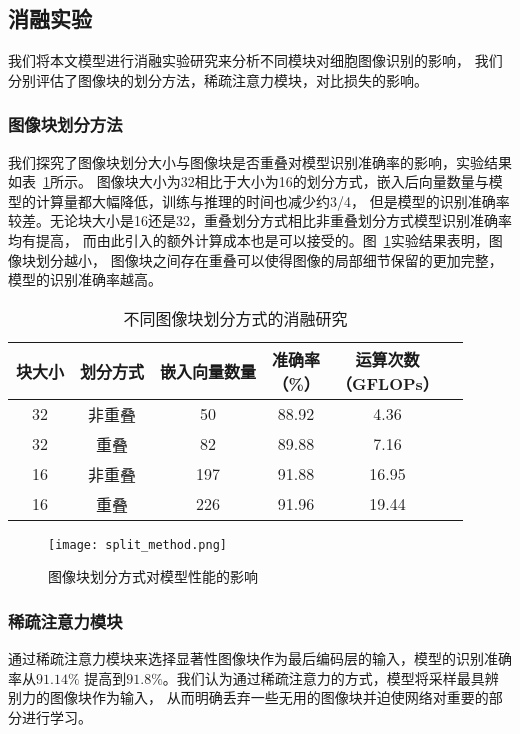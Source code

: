 \subsection{消融实验}
我们将本文模型进行消融实验研究来分析不同模块对细胞图像识别的影响，
我们分别评估了图像块的划分方法，稀疏注意力模块，对比损失的影响。

\subsubsection{图像块划分方法}
我们探究了图像块划分大小与图像块是否重叠对模型识别准确率的影响，实验结果如表~\ref{table:split_method}所示。
图像块大小为32相比于大小为16的划分方式，嵌入后向量数量与模型的计算量都大幅降低，训练与推理的时间也减少约3/4，
但是模型的识别准确率较差。无论块大小是16还是32，重叠划分方式相比非重叠划分方式模型识别准确率均有提高，
而由此引入的额外计算成本也是可以接受的。图~\ref{fig:split_method}实验结果表明，图像块划分越小，
图像块之间存在重叠可以使得图像的局部细节保留的更加完整，模型的识别准确率越高。

\begin{table}
  \caption{不同图像块划分方式的消融研究}   
  \centering 
  \label{table:split_method}
  \begin{tabular}{cccccc}
    \toprule[2pt]
    块大小 & 划分方式 & 嵌入向量数量 & \makecell{准确率 \\（\%）} & \makecell{运算次数 \\（GFLOPs）}\\
    \midrule[1.5pt] 
        32 & 非重叠 & 50 & 88.92 & 4.36  \\ 
        32 & 重叠 & 82 & 89.88 & 7.16  \\ 
        16 & 非重叠 & 197 & 91.88 & 16.95  \\ 
        16 & 重叠 & 226 & 91.96 & 19.44  \\ 
    \bottomrule[2pt]      
  \end{tabular} 
\end{table}
\begin{figure} 
  \centering   
  \texttt{[image: split\_method.png]}   
  \caption{图像块划分方式对模型性能的影响}   
  \label{fig:split_method} 
\end{figure}  

\subsubsection{稀疏注意力模块}
通过稀疏注意力模块来选择显著性图像块作为最后编码层的输入，模型的识别准确率从$91.14\%$ 
提高到$91.8\%$。我们认为通过稀疏注意力的方式，模型将采样最具辨别力的图像块作为输入，
从而明确丢弃一些无用的图像块并迫使网络对重要的部分进行学习。

